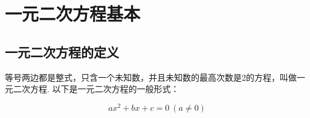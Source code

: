 \section{一元二次方程基本}
\subsection{一元二次方程的定义}


\begin{definition}[一元二次方程的定义]
  
等号两边都是整式，只含一个未知数，并且未知数的最高次数是2的方程，叫做一元二次方程. 以下是一元二次方程的一般形式：

\begin{equation}
    ax^2 + bx + c = 0 \ (a \neq 0)
    \label{general_formula}
\end{equation}

 
\end{definition}



